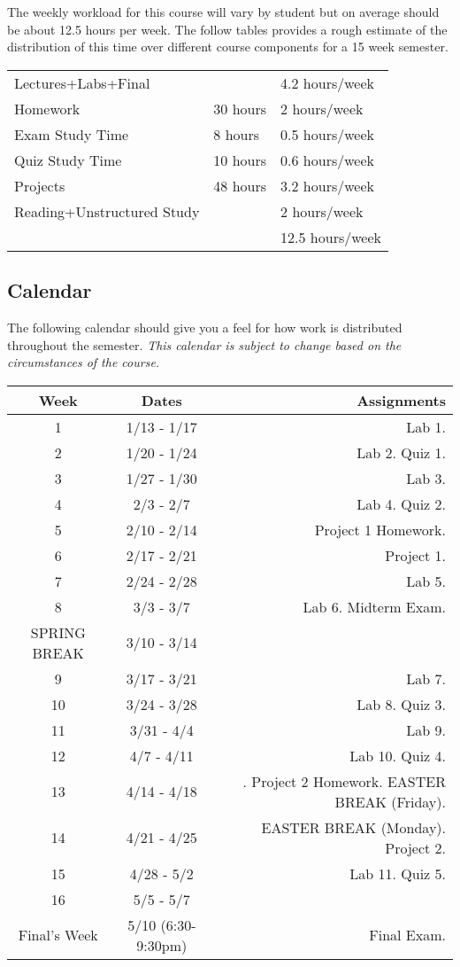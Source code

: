 \documentclass[10pt]{article}
\begin{document}
The weekly workload for this course will vary by student but on average should be about 12.5 hours per week.  The follow tables provides a rough estimate of the distribution of this time over different course components for a 15 week semester. 
\begin{center}
\begin{tabular}{|l|l|l|}
\hline
Lectures+Labs+Final &      & 4.2 hours/week \\ 
Homework & 30 hours        & 2 hours/week \\
Exam Study Time & 8 hours  & 0.5 hours/week \\ 
Quiz Study Time & 10 hours & 0.6 hours/week \\
Projects & 48 hours        & 3.2 hours/week \\
Reading+Unstructured Study & & 2 hours/week \\
\hline 
& & 12.5 hours/week \\ 
\hline
\end{tabular}
\end{center}


\subsection{Calendar}

The following calendar should give you a feel for how work is distributed throughout the semester.  \textit{This calendar is subject to change based on the circumstances of the course.}
\begin{center}
\begin{tabular}{|c|c|r|}
\hline 
Week & Dates & Assignments \\
\hline
1 & 1/13 - 1/17 &  Lab 1.\\
\hline
2 & 1/20 - 1/24 & Lab 2.  Quiz 1.\\
\hline
3 & 1/27 - 1/30 & Lab 3.  \\
\hline
4 & 2/3 - 2/7 & Lab 4. Quiz 2.  \\
\hline
5 & 2/10 - 2/14 & Project 1 Homework. \\
\hline
6 & 2/17 - 2/21 & Project 1. \\
\hline
7 & 2/24 - 2/28 & Lab 5.  \\
\hline
8 & 3/3 - 3/7 & Lab 6. Midterm Exam.  \\
\hline 
SPRING BREAK & 3/10 - 3/14& \\
\hline
9 & 3/17 - 3/21 & Lab 7. \\
\hline
10 & 3/24 - 3/28 & Lab 8.  Quiz 3. \\
\hline
11 & 3/31 - 4/4 & Lab 9. \\
\hline
12 & 4/7 - 4/11 & Lab 10. Quiz 4. \\
\hline
13 & 4/14 - 4/18 &  . Project 2 Homework. EASTER BREAK (Friday).\\
\hline
14 & 4/21 - 4/25 & EASTER BREAK (Monday). Project 2. \\
\hline
15 & 4/28 - 5/2 & Lab 11. Quiz 5. \\ 
\hline
16 & 5/5 - 5/7 & \\
\hline
Final's Week & 5/10 (6:30-9:30pm) & Final Exam. \\ 
\hline
\end{tabular}
\end{center}
\end{document}
